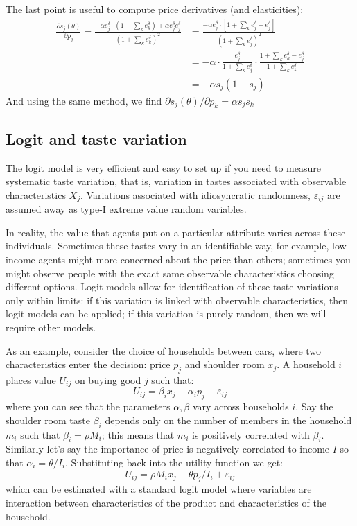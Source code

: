 The last point is useful to compute price derivatives (and elasticities): \begin{align*}
\frac{\partial s_j(\theta)}{\partial p_j} = \frac{-\alpha e^\delta_j \cdot (1 + \sum_{k}e^\delta_k ) + \alpha e^\delta_j e^\delta_j }{(1 + \sum_{k} e^\delta_k )^2} & = \frac{-\alpha e^\delta_j\cdot\left[ 1 + \sum_{k}e^\delta_j - e^\delta_j\right]}{(1 + \sum_{k}e^\delta_j)^2} \\ 
& = - \alpha \cdot \frac{e^\delta_j}{1 + \sum_{k}e^\delta_j} \cdot \frac{1 + \sum_{k}e^\delta_k - e^\delta_j}{1 + \sum_{k}e^\delta_k} \\
& = - \alpha s_j (1 - s_j)
\end{align*} And using the same method, we find $\partial s_j(\theta)/\partial p_k = \alpha s_j s_k $

\subsection{Logit and taste variation}\label{sssec:tastevar}

The logit model is very efficient and easy to set up if you need to measure systematic taste variation, that is, variation in tastes associated with observable characteristics $X_j$. Variations associated with idiosyncratic randomness, $\varepsilon_{ij}$ are assumed away as type-I extreme value random variables.

In reality, the value that agents put on a particular attribute varies across these individuals. Sometimes these tastes vary in an identifiable way, for example, low-income agents might more concerned about the price than others; sometimes you might observe people with the exact same observable characteristics choosing different options. Logit models allow for identification of these taste variations only within limits: if this variation is linked with observable characteristics, then logit models can be applied; if this variation is purely random, then we will require other models.

As an example, consider the choice of households between cars, where two characteristics enter the decision: price $p_j$ and shoulder room $x_j$. A household $i$ places value $U_{ij}$ on buying good $j$ such that: $$U_{ij} = \beta_i x_j - \alpha_i p_j + \varepsilon_{ij} $$ where you can see that the parameters $\alpha, \beta$ vary across households $i$. Say the shoulder room taste $\beta_i$ depends only on the number of members in the household $m_i$ such that $\beta_i = \rho M_i$; this means that $m_i$ is positively correlated with $\beta_i$. Similarly let's say the importance of price is negatively correlated to income $I$ so that $\alpha_i = \theta/I_i$. Substituting back into the utility function we get: $$U_{ij} = \rho M_i x_j - \theta p_j/I_i + \varepsilon_{ij} $$ which can be estimated with a standard logit model where variables are interaction between characteristics of the product and characteristics of the household.

